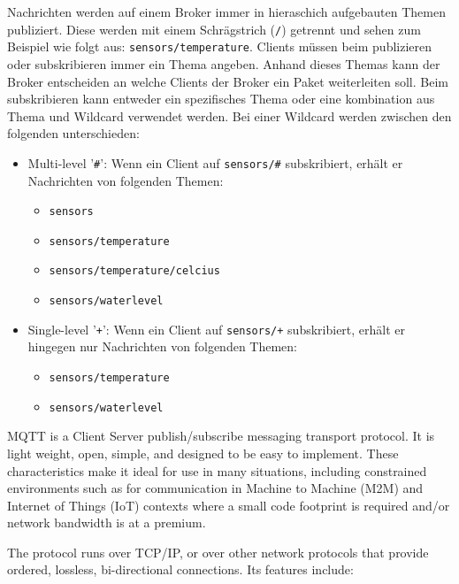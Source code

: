 Nachrichten werden auf einem Broker immer in hieraschich aufgebauten Themen publiziert. Diese werden mit einem Schrägstrich (\verb|/|) getrennt und sehen zum Beispiel wie folgt aus: \verb|sensors/temperature|. Clients müssen beim publizieren oder subskribieren immer ein Thema angeben. Anhand dieses Themas kann der Broker entscheiden an welche Clients der Broker ein Paket weiterleiten soll. Beim subskribieren kann entweder ein spezifisches Thema oder eine kombination aus Thema und Wildcard verwendet werden. Bei einer Wildcard werden zwischen den folgenden unterschieden:
\begin{itemize}
    \item Multi-level '\verb|#|': Wenn ein Client auf \verb|sensors/#| subskribiert, erhält er Nachrichten von folgenden Themen:
    \begin{itemize}
        \item \verb|sensors|
        \item \verb|sensors/temperature|
        \item \verb|sensors/temperature/celcius|
        \item \verb|sensors/waterlevel|
    \end{itemize}
    \item Single-level '\verb|+|': Wenn ein Client auf \verb|sensors/+| subskribiert, erhält er hingegen nur Nachrichten von folgenden Themen:
    \begin{itemize}
        \item \verb|sensors/temperature|
        \item \verb|sensors/waterlevel|
    \end{itemize}
\end{itemize}



\newpage




MQTT is a Client Server publish/subscribe messaging transport protocol. It is light weight, open, simple, and designed to be easy to implement. These characteristics make it ideal for use in many situations, including constrained environments such as for communication in Machine to Machine (M2M) and Internet of Things (IoT) contexts where a small code footprint is required and/or network bandwidth is at a premium.

The protocol runs over TCP/IP, or over other network protocols that provide ordered, lossless, bi-directional connections. Its features include:

